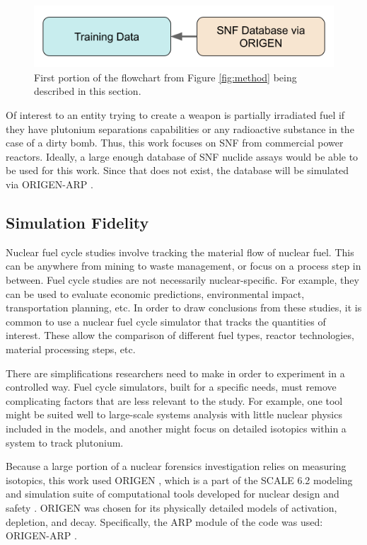 \begin{figure}[H]
  \centering
  \includegraphics[width=0.7\linewidth]{./chapters/exp1/methodology1.png}
  \caption{First portion of the flowchart from Figure \ref{fig:method} being 
           described in this section.}
\end{figure}

Of interest to an entity trying to create a weapon is partially irradiated fuel
if they have plutonium separations capabilities or any radioactive substance in
the case of a dirty bomb. Thus, this work focuses on \gls{SNF} from commercial
power reactors. Ideally, a large enough database of \gls{SNF} nuclide assays
would be able to be used for this work. Since that does not exist, the 
database will be simulated via \gls{ORIGEN-ARP} \cite{origen, origenarp}.  

\subsection{Simulation Fidelity}
\label{sec:fidelity}

Nuclear fuel cycle studies involve tracking the material flow of nuclear fuel.
This can be anywhere from mining to waste management, or focus on a process
step in between. Fuel cycle studies are not necessarily nuclear-specific. For
example, they can be used to evaluate economic predictions, environmental
impact, transportation planning, etc.  In order to draw conclusions from these
studies, it is common to use a nuclear fuel cycle simulator that tracks the
quantities of interest. These allow the comparison of different fuel types,
reactor technologies, material processing steps, etc. 

There are simplifications researchers need to make in order to experiment in a
controlled way. Fuel cycle simulators, built for a specific needs, must remove
complicating factors that are less relevant to the study.  For example, one
tool might be suited well to large-scale systems analysis with little nuclear
physics included in the models, and another might focus on detailed isotopics
within a system to track plutonium.

Because a large portion of a nuclear forensics investigation relies on
measuring isotopics, this work used \gls{ORIGEN} \cite{origen}, which is a part
of the \gls{SCALE} 6.2 modeling and simulation suite of computational tools
developed for nuclear design and safety \cite{scale}. \gls{ORIGEN} was chosen
for its physically detailed models of activation, depletion, and decay.
Specifically, the ARP module of the code was used: \gls{ORIGEN-ARP}
\cite{origenarp}.

